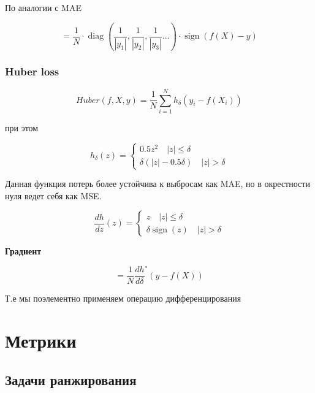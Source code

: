 \documentclass{article}
\begin{document}
    \quad  

    По аналогии с MAE 

    \begin{equation}
        [D_{f(X)}(MAPE)] =  \frac{1}{N} \cdot \operatorname{diag}(\frac{1}{| y_{1} |}, \frac{1}{| y_{2} |}, \frac{1}{| y_{3} |} ...) \cdot  \operatorname{sign}(f(X) - y)
    \end{equation}


    \subsubsection{Huber loss}

    \begin{equation}
        Huber(f, X, y) = \frac{1}{N} \sum_{i = 1}^{N} h_{\delta}(y_{i} - f(X_{i}))
    \end{equation}

    при этом 

    \[h_{\delta}(z)=
    \begin{cases}
        0.5 z^2  \quad | z | \leq \delta \\
        \delta (|z| - 0.5 \delta) \quad | z | > \delta
    \end{cases}
    \]

    Данная функция потерь более устойчива к выбросам как MAE, но в окрестности нуля ведет себя как MSE. 

    \[\frac{dh}{dz}(z) =
    \begin{cases}
        z  \quad | z | \leq \delta \\
        \delta \operatorname{sign}(z) \quad | z | > \delta
    \end{cases}
    \]

    \quad 

    \textbf{Градиент}

    \quad

    \begin{equation}
        [D_{f(X)}(Huber)] = \frac{1}{N} \frac{dh}{d\delta}^{\circ}(y - f(X))
    \end{equation}

    Т.е мы поэлементно применяем операцию дифференцирования


    \section{Метрики}

    \subsection{Задачи ранжирования}
\end{document}
